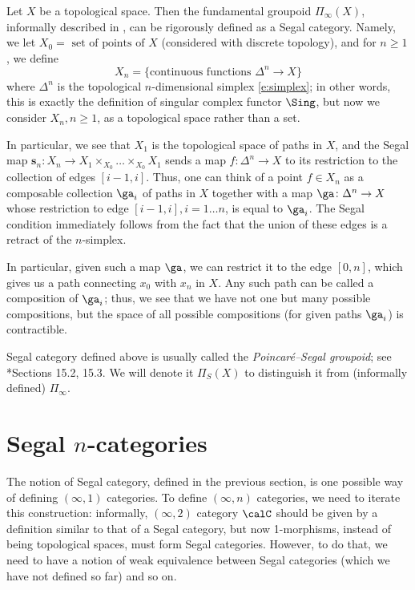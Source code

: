 \begin{example}\label{x:poincare-segal}
  Let $X$ be a topological space. Then the fundamental groupoid
  $\Pi_{\infty}(X)$, informally described in ,
  can be rigorously defined as a Segal category. Namely, we let
  $X_0=\text{ set of points of $X$}$ (considered with discrete topology),
  and for $n\ge 1$, we define
  $$
    X_n= \{\text{continuous functions $\Delta^n\to X$}\}
  $$
  where $\Delta^n$ is the topological $n$-dimensional simplex \eqref{e:simplex};
  in other words, this is exactly the definition of singular complex functor
  $\Sing$, but now we consider $X_n, n\ge 1$, as a topological space rather
  than a set.

  In particular, we see that $X_1$ is the topological space of paths in $X$,
  and the Segal map $\mathbf{s}_n\colon X_n \to X_1\times_{X_0}\dots\times_{X_0}
  X_1$ sends a map $f\colon \Delta^n\to X$ to its restriction to the collection
  of edges $[i-1, i]$. Thus, one can think of a point $f\in X_n$ as a composable
  collection $\ga_i$ of paths in $X$ together with a map $\ga \colon
  \Delta^n\to X$ whose restriction to edge $[i-1, i], i=1\dots n$, is equal to
  $\ga_i$. The Segal condition immediately follows from the fact that the union of
  these edges is a retract of the $n$-simplex.

  In particular, given such a map $\ga$, we can restrict it to the edge $[0,n]$,
  which gives us a path connecting $x_0$ with $x_n$ in $X$. Any such path can be
  called a composition of $\ga_i$; thus, we see that we have not one but many
  possible compositions, but the space of all possible compositions (for given
  paths $\ga_i$) is contractible.

  Segal category defined above is usually called the \emph{Poincar\'e--Segal
  groupoid}; see *{Sections 15.2, 15.3}. We will denote it
  $\Pi_S(X)$ to distinguish it from (informally defined) $\Pi_{\infty}$.

\end{example}

\section{Segal $n$-categories}\label{s:segal-ncat}

The notion of Segal category, defined in the previous section, is one possible
way of defining $(\infty, 1)$ categories. To define $(\infty,n)$ categories, we
need to iterate this construction: informally, $(\infty, 2)$ category $\calC$
should be given by a definition similar to that of a Segal category, but now
1-morphisms, instead of being topological spaces, must form Segal categories.
However, to do that, we need to have a notion of weak equivalence between Segal
categories (which we have not defined so far) and so on.


